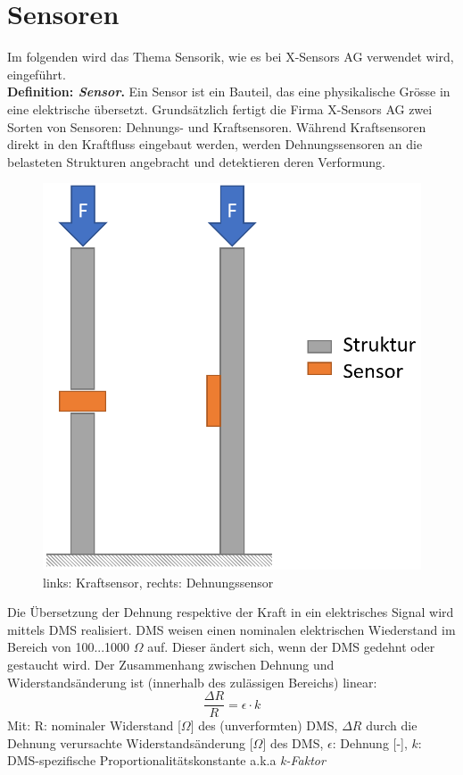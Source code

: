 \documentclass[12pt,a4paper]{article}
\begin{document}
	\section{Sensoren}
	Im folgenden wird das Thema Sensorik, wie es bei X-Sensors AG verwendet wird, eingeführt.\\
	\textbf{Definition: \textit{Sensor}.}\newline
	Ein Sensor ist ein Bauteil, das eine physikalische Grösse in eine elektrische übersetzt.
	Grundsätzlich fertigt die Firma X-Sensors AG zwei Sorten von Sensoren: Dehnungs- und Kraftsensoren. Während Kraftsensoren direkt in den Kraftfluss eingebaut werden, werden Dehnungssensoren an die belasteten Strukturen angebracht und detektieren deren Verformung.
	\begin{figure}[H]
		\centering
		\includegraphics[width=.5\linewidth]{imgs/screenshot001}
		\caption{links: Kraftsensor, rechts: Dehnungssensor}
		\label{fig:screenshot001}
	\end{figure}\noindent
	Die Übersetzung der Dehnung respektive der Kraft in ein elektrisches Signal wird mittels DMS realisiert. DMS weisen einen nominalen elektrischen Wiederstand im Bereich von 100...1000 $\Omega$ auf. Dieser ändert sich, wenn der DMS gedehnt oder gestaucht wird. Der Zusammenhang zwischen Dehnung und Widerstandsänderung ist (innerhalb des zulässigen Bereichs) linear:
	\begin{equation}
		\frac{\Delta R}{R} = \epsilon \cdot k
	\end{equation}
	Mit: R: nominaler Widerstand [$\Omega$] des (unverformten) DMS, ${\Delta R}$ durch die Dehnung verursachte Widerstandsänderung [$\Omega$] des DMS, $\epsilon$: Dehnung [-], $k$: DMS-spezifische Proportionalitätskonstante a.k.a \textit{k-Faktor}
\end{document}
